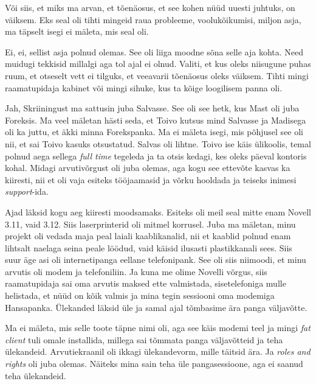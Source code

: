 
Või siis, et miks ma arvan, et tõenäosus, et see kohen nüüd uuesti juhtuks, on väiksem. Eks seal oli tihti mingeid raua probleeme, voolukõikumisi, miljon asja, ma täpselt isegi ei mäleta, mis seal oli. 


Ei, ei, sellist asja polnud olemas. See oli liiga moodne sõna selle aja kohta. Need muidugi tekkisid millalgi aga tol ajal ei olnud. Valiti, et kus oleks niisugune puhas ruum, et otseselt vett ei tilguks, et  veeavarii tõenäosus oleks väiksem. Tihti mingi raamatupidaja kabinet või mingi sihuke, kus ta kõige loogilisem panna oli. 


Jah, Skriiningust ma sattusin juba Salvasse. See oli see hetk, kus Mast oli juba Foreksis. Ma veel mäletan hästi seda, et Toivo kutsus mind Salvasse ja Madisega oli ka juttu, et äkki minna Forekspanka. Ma ei mäleta isegi, mis põhjusel see oli nii, et sai Toivo kasuks otsustatud. Salvas oli lihtne. Toivo ise käis ülikoolis, temal polnud aega sellega \emph{full time} tegeleda ja ta otsis kedagi, kes oleks päeval kontoris kohal. Midagi arvutivõrgust oli juba olemas, aga kogu see ettevõte kasvas ka kiiresti, nii et  oli vaja esiteks tööjaamasid ja võrku hooldada ja teiseks inimesi \emph{support}-ida. 

Ajad läksid kogu aeg kiiresti moodsamaks. Esiteks oli meil seal mitte enam Novell 3.11, vaid 3.12. Siis laserprinterid oli mitmel korrusel. Juba ma mäletan, minu projekt oli vedada maja peal laiali kaablikanalid, nii et kaablid polnud enam lihtsalt naelaga seina peale löödud, vaid käisid ilusasti plastikkanali sees. Siis suur äge asi oli internetipanga eellane telefonipank. See oli siis niimoodi, et minu arvutis oli modem ja telefoniliin. Ja kuna me olime  Novelli võrgus, siis raamatupidaja sai oma arvutis maksed ette valmistada, sisetelefoniga mulle helistada, et nüüd on kõik valmis ja mina tegin  sessiooni oma modemiga Hansapanka. Ülekanded läksid üle ja samal ajal tõmbasime ära panga väljavõtte. 


Ma ei mäleta, mis selle toote täpne nimi oli, aga see käis modemi teel ja mingi \emph{fat client} tuli omale installida, millega sai tõmmata panga väljavõtteid ja teha ülekandeid. Arvutiekraanil oli ikkagi ülekandevorm, mille täitsid ära. Ja \emph{roles and rights} oli juba olemas. Näiteks mina sain teha üle pangasessioone, aga ei saanud teha ülekandeid. 

